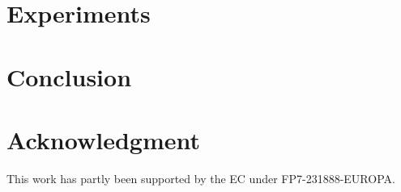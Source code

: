 \documentclass[letterpaper, 10 pt, conference]{sty/ieeeconf}
\begin{document}
\section{Experiments\label{sec:exp}}


\section{Conclusion\label{sec:conc}}


\section*{Acknowledgment}
This work has partly been supported by the EC under FP7-231888-EUROPA.



\end{document}
